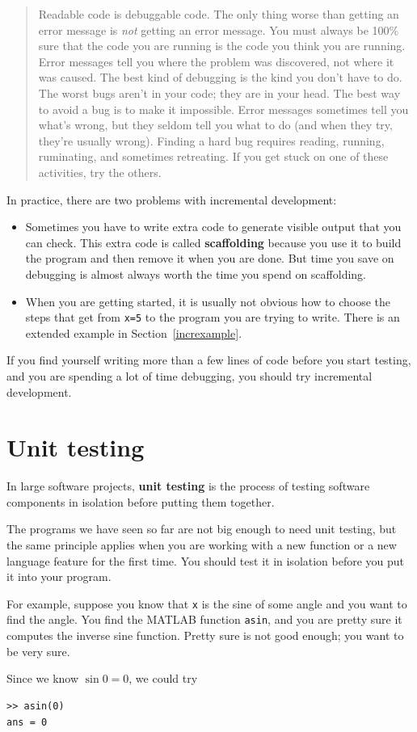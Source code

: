\documentclass{book}
\newcommand{\displaythrm}[1]{%
    \ifthenelse{\equal{#1}{1}}%
        {Readable code is debuggable code.}{%
    \ifthenelse{\equal{#1}{2}}%
        {The only thing worse than getting an error message is {\em
         not} getting an error message.}{%
    \ifthenelse{\equal{#1}{3}}%
        {You must always be 100\% sure that the code you are running
         is the code you think you are running.}{%
    \ifthenelse{\equal{#1}{4}}%
        {Error messages tell you where the problem was discovered,
         not where it was caused.}{%
    \ifthenelse{\equal{#1}{5}}%
        {The best kind of debugging is the kind you don't have to do.}{%
    \ifthenelse{\equal{#1}{6}}%
        {The worst bugs aren't in your code; they are in your head.}{%
    \ifthenelse{\equal{#1}{7}}%
        {The best way to avoid a bug is to make it impossible.}{%
    \ifthenelse{\equal{#1}{8}}%
        {Error messages sometimes tell you what's wrong, but they
         seldom tell you what to do (and when they try, they're usually
         wrong).}{%
    \ifthenelse{\equal{#1}{9}}%
        {Finding a hard bug requires reading, running, ruminating,
         and sometimes retreating.  If you get stuck on one of these
         activities, try the others.}{%
    {}%
}}}}}}}}}}%
\begin{document}
\begin{quote}
\displaythrm{5}
\end{quote}

In practice, there are two problems with incremental development:

\begin{itemize}

\item Sometimes you have to write extra code to
generate visible output that you can check.  This extra code is
called {\bf scaffolding} because you use it to build the program
and then remove it when you are done.  But time you save on
debugging is almost always worth the time you spend on
scaffolding.

\item When you are getting started, it is usually not obvious how to
choose the steps that get from {\tt x=5} to the program you are trying
to write.  There is an extended example in Section~\ref{increxample}.

\end{itemize}

If you find yourself writing more than a few lines of code before
you start testing, and you are spending a lot of time debugging,
you should try incremental development.


\section{Unit testing}

In large software projects, {\bf unit testing} is the process of
testing software components in isolation before putting
them together.

The programs we have seen so far are not
big enough to need unit testing, but the same principle applies
when you are working with a new function or a new language feature
for the first time.  You should test it in isolation before you
put it into your program.

For example, suppose you know that {\tt x} is the sine of some
angle and you want to find the angle.  You find the MATLAB function
{\tt asin}, and you are pretty sure it computes the inverse sine
function.  Pretty sure is not good enough; you want to be very sure.

Since we know $\sin 0 = 0$, we could try

\begin{verbatim}
>> asin(0)
ans = 0
\end{verbatim}
\end{document}
